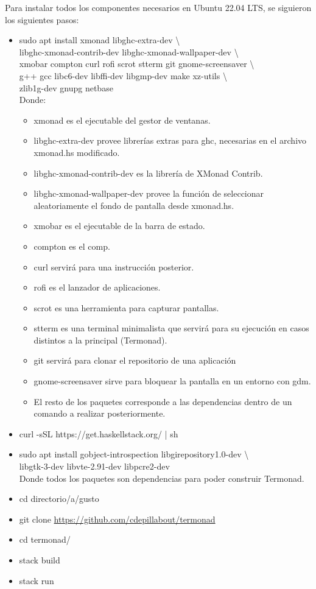 \normalsize{ \indent
Para instalar todos los componentes necesarios en
Ubuntu 22.04 LTS, se siguieron los siguientes pasos:
}
\begin{itemize}
	\item sudo apt install xmonad libghc-extra-dev
	\textbackslash \\ libghc-xmonad-contrib-dev
	libghc-xmonad-wallpaper-dev \textbackslash \\
	xmobar compton curl rofi scrot stterm git
	gnome-screensaver \textbackslash \\ g++ gcc
	libc6-dev libffi-dev libgmp-dev make	xz-utils
	\textbackslash \\ zlib1g-dev gnupg netbase \\
	Donde:
	\begin{itemize}
		\item xmonad es el ejecutable del gestor
		de ventanas.
		\item libghc-extra-dev provee librerías
		extras para \acrshort{ghc}, necesarias
		en el archivo xmonad.hs modificado.
		\item libghc-xmonad-contrib-dev es la
		librería de XMonad Contrib.
		\item libghc-xmonad-wallpaper-dev provee
		la función de seleccionar aleatoriamente
		el fondo de pantalla desde xmonad.hs.
		\item xmobar es el ejecutable de la barra
		de estado.
		\item compton es el \gls{comp}.
		\item curl servirá para una instrucción
		posterior.
		\item rofi es el lanzador de aplicaciones.
		\item scrot es una herramienta para
		capturar pantallas.
		\item stterm es una terminal minimalista
		que servirá para su ejecución en casos
		distintos a la principal (Termonad).
		\item git servirá para clonar el
		repositorio de una aplicación
		\item gnome-screensaver sirve para
		bloquear la pantalla en un entorno con
		\acrshort{gdm}.
		\item El resto de los paquetes
		corresponde a las dependencias dentro de
		un comando a realizar posteriormente.
	\end{itemize}
	\item curl -sSL https://get.haskellstack.org/
	| sh
	\item sudo apt install gobject-introspection
	libgirepository1.0-dev \textbackslash \\
	libgtk-3-dev libvte-2.91-dev libpcre2-dev \\
	Donde todos los paquetes son dependencias
	para poder construir Termonad.
	\item cd directorio/a/gusto
	\item git clone
	\url{https://github.com/cdepillabout/termonad}
	\item cd termonad/
	\item stack build
	\item stack run
\end{itemize}
